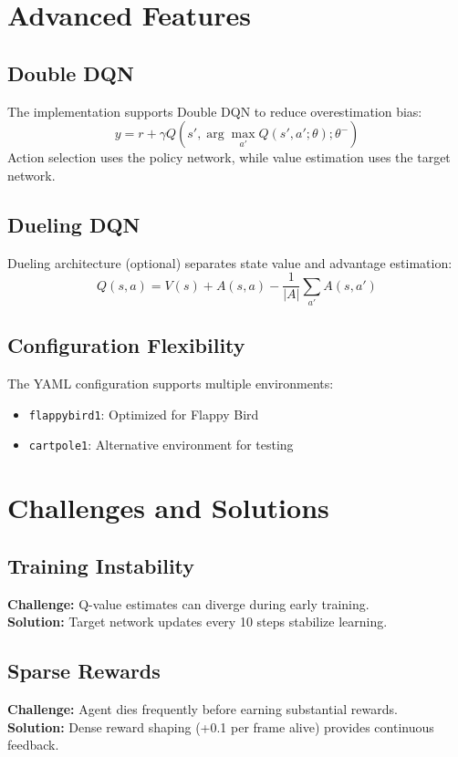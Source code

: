 \documentclass[12pt,a4paper]{article}
\begin{document}
\section{Advanced Features}

\subsection{Double DQN}
The implementation supports Double DQN to reduce overestimation bias:
\begin{equation}
y = r + \gamma Q(s', \arg\max_{a'} Q(s', a'; \theta); \theta^-)
\end{equation}
Action selection uses the policy network, while value estimation uses the target network.

\subsection{Dueling DQN}
Dueling architecture (optional) separates state value and advantage estimation:
\begin{equation}
Q(s, a) = V(s) + A(s, a) - \frac{1}{|A|}\sum_{a'} A(s, a')
\end{equation}

\subsection{Configuration Flexibility}
The YAML configuration supports multiple environments:
\begin{itemize}
    \item \texttt{flappybird1}: Optimized for Flappy Bird
    \item \texttt{cartpole1}: Alternative environment for testing
\end{itemize}

\section{Challenges and Solutions}

\subsection{Training Instability}
\textbf{Challenge:} Q-value estimates can diverge during early training.
\\
\textbf{Solution:} Target network updates every 10 steps stabilize learning.

\subsection{Sparse Rewards}
\textbf{Challenge:} Agent dies frequently before earning substantial rewards.
\\
\textbf{Solution:} Dense reward shaping (+0.1 per frame alive) provides continuous feedback.
\end{document}
